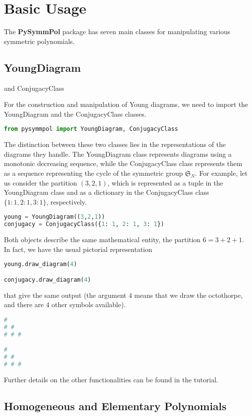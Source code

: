 \documentclass[a4paper,10pt]{amsart}
\begin{document}
\section{Basic Usage}

The \textbf{PySymmPol} package has seven main classes for manipulating
various symmetric polynomials.

\subsection{YoungDiagram} and ConjugacyClass

For the construction and manipulation of Young diagrams, we need to import 
the YoungDiagram and the ConjugacyClass classes. 
\begin{lstlisting}[language=Python]
from pysymmpol import YoungDiagram, ConjugacyClass
\end{lstlisting}

The distinction between these two classes lies in the representations of the diagrams 
they handle. The YoungDiagram class represents diagrams using a monotonic decreasing sequence, 
while the ConjugacyClass class represents them as a sequence representing the cycle 
of the symmetric group $\mathfrak{S}_N$. For example, let us consider the partition
$(3,2,1)$, which is represented as a tuple in the YoungDiagram class and 
as a dictionary in the ConjugacyClass class $\{1: 1, 2: 1, 3: 1\}$, respectively.
\begin{lstlisting}[language=Python]
young = YoungDiagram((3,2,1))
conjugacy = ConjugacyClass({1: 1, 2: 1, 3: 1})
\end{lstlisting}
Both objects describe the same mathematical entity, the partition \(6=3+2+1\).
In fact, 
we have the usual pictorial representation 
\begin{lstlisting}[language=Python]
young.draw_diagram(4)

conjugacy.draw_diagram(4)
\end{lstlisting}
that give the same output (the argument 4 means that we draw the octothorpe, and
there are 4 other symbols available).
\begin{lstlisting}[language=Python]
#
# #
# # #

#
# #
# # #
\end{lstlisting}
Further details on the other functionalities can be found in the tutorial.

\subsection{Homogeneous and Elementary Polynomials}
\end{document}
